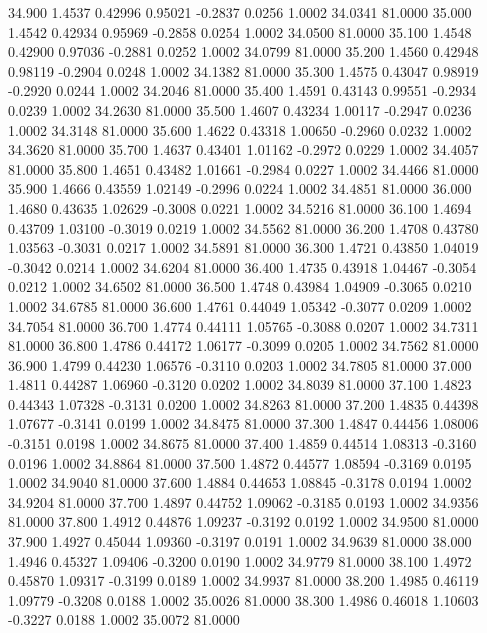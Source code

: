   34.900   1.4537   0.42996   0.95021  -0.2837   0.0256   1.0002  34.0341  81.0000
  35.000   1.4542   0.42934   0.95969  -0.2858   0.0254   1.0002  34.0500  81.0000
  35.100   1.4548   0.42900   0.97036  -0.2881   0.0252   1.0002  34.0799  81.0000
  35.200   1.4560   0.42948   0.98119  -0.2904   0.0248   1.0002  34.1382  81.0000
  35.300   1.4575   0.43047   0.98919  -0.2920   0.0244   1.0002  34.2046  81.0000
  35.400   1.4591   0.43143   0.99551  -0.2934   0.0239   1.0002  34.2630  81.0000
  35.500   1.4607   0.43234   1.00117  -0.2947   0.0236   1.0002  34.3148  81.0000
  35.600   1.4622   0.43318   1.00650  -0.2960   0.0232   1.0002  34.3620  81.0000
  35.700   1.4637   0.43401   1.01162  -0.2972   0.0229   1.0002  34.4057  81.0000
  35.800   1.4651   0.43482   1.01661  -0.2984   0.0227   1.0002  34.4466  81.0000
  35.900   1.4666   0.43559   1.02149  -0.2996   0.0224   1.0002  34.4851  81.0000
  36.000   1.4680   0.43635   1.02629  -0.3008   0.0221   1.0002  34.5216  81.0000
  36.100   1.4694   0.43709   1.03100  -0.3019   0.0219   1.0002  34.5562  81.0000
  36.200   1.4708   0.43780   1.03563  -0.3031   0.0217   1.0002  34.5891  81.0000
  36.300   1.4721   0.43850   1.04019  -0.3042   0.0214   1.0002  34.6204  81.0000
  36.400   1.4735   0.43918   1.04467  -0.3054   0.0212   1.0002  34.6502  81.0000
  36.500   1.4748   0.43984   1.04909  -0.3065   0.0210   1.0002  34.6785  81.0000
  36.600   1.4761   0.44049   1.05342  -0.3077   0.0209   1.0002  34.7054  81.0000
  36.700   1.4774   0.44111   1.05765  -0.3088   0.0207   1.0002  34.7311  81.0000
  36.800   1.4786   0.44172   1.06177  -0.3099   0.0205   1.0002  34.7562  81.0000
  36.900   1.4799   0.44230   1.06576  -0.3110   0.0203   1.0002  34.7805  81.0000
  37.000   1.4811   0.44287   1.06960  -0.3120   0.0202   1.0002  34.8039  81.0000
  37.100   1.4823   0.44343   1.07328  -0.3131   0.0200   1.0002  34.8263  81.0000
  37.200   1.4835   0.44398   1.07677  -0.3141   0.0199   1.0002  34.8475  81.0000
  37.300   1.4847   0.44456   1.08006  -0.3151   0.0198   1.0002  34.8675  81.0000
  37.400   1.4859   0.44514   1.08313  -0.3160   0.0196   1.0002  34.8864  81.0000
  37.500   1.4872   0.44577   1.08594  -0.3169   0.0195   1.0002  34.9040  81.0000
  37.600   1.4884   0.44653   1.08845  -0.3178   0.0194   1.0002  34.9204  81.0000
  37.700   1.4897   0.44752   1.09062  -0.3185   0.0193   1.0002  34.9356  81.0000
  37.800   1.4912   0.44876   1.09237  -0.3192   0.0192   1.0002  34.9500  81.0000
  37.900   1.4927   0.45044   1.09360  -0.3197   0.0191   1.0002  34.9639  81.0000
  38.000   1.4946   0.45327   1.09406  -0.3200   0.0190   1.0002  34.9779  81.0000
  38.100   1.4972   0.45870   1.09317  -0.3199   0.0189   1.0002  34.9937  81.0000
  38.200   1.4985   0.46119   1.09779  -0.3208   0.0188   1.0002  35.0026  81.0000
  38.300   1.4986   0.46018   1.10603  -0.3227   0.0188   1.0002  35.0072  81.0000
